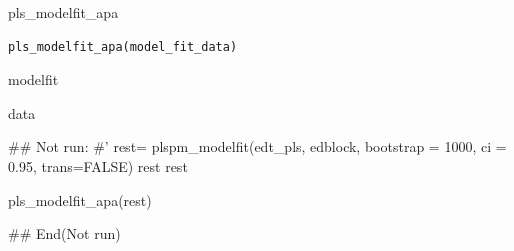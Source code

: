 \documentclass[a4paper]{book}
\begin{document}
%
\begin{Description}
pls\_modelfit\_apa
\end{Description}
%
\begin{Usage}
\begin{verbatim}
pls_modelfit_apa(model_fit_data)
\end{verbatim}
\end{Usage}
%
\begin{Arguments}
\begin{ldescription}
\item[\code{model\_fit\_data}] modelfit
\end{ldescription}
\end{Arguments}
%
\begin{Value}
data
\end{Value}
%
\begin{Examples}
\begin{ExampleCode}

\#\# Not run: 
#'
rest= plspm_modelfit(edt_pls, edblock, bootstrap = 1000, ci = 0.95, trans=FALSE)
rest
rest%

pls_modelfit_apa(rest)


## End(Not run)
\end{ExampleCode}
\end{Examples}
\end{document}
